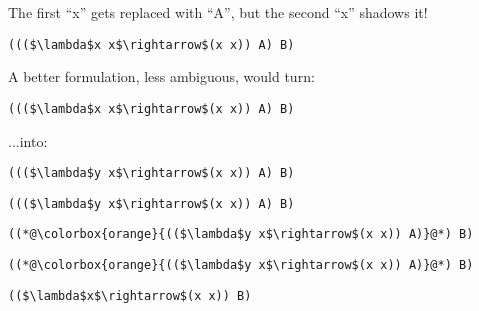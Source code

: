 \documentclass{beamer}
\begin{document}
\begin{frame}[fragile]{\CurrentSection}
\begin{exampleblock}{}
The first ``x'' gets replaced with ``A'', but the second ``x'' shadows it!
\end{exampleblock}

 
\lstset{basicstyle=\ttfamily\small}\lstset{numbers=none}\lstset{language=ML}\begin{lstlisting}
((($\lambda$x x$\rightarrow$(x x)) A) B)
\end{lstlisting}
 

\end{frame}

\begin{frame}[fragile]{\CurrentSection}
\begin{exampleblock}{}
A better formulation, less ambiguous, would turn:
\end{exampleblock}

 
\lstset{basicstyle=\ttfamily\small}\lstset{numbers=none}\lstset{language=ML}\begin{lstlisting}
((($\lambda$x x$\rightarrow$(x x)) A) B)
\end{lstlisting}
 
\begin{exampleblock}{}
...into:
\end{exampleblock}

 
\lstset{basicstyle=\ttfamily\small}\lstset{numbers=none}\lstset{language=ML}\begin{lstlisting}
((($\lambda$y x$\rightarrow$(x x)) A) B)
\end{lstlisting}
 

\end{frame}

\begin{frame}[fragile]{\CurrentSection}
\lstset{basicstyle=\ttfamily\small}\lstset{numbers=none}\lstset{language=ML}\begin{lstlisting}
((($\lambda$y x$\rightarrow$(x x)) A) B)
\end{lstlisting}
\pause\lstset{language=ML}\begin{lstlisting}
((*@\colorbox{orange}{(($\lambda$y x$\rightarrow$(x x)) A)}@*) B)
\end{lstlisting}

\end{frame}

\begin{frame}[fragile]{\CurrentSection}
\lstset{basicstyle=\ttfamily\small}\lstset{numbers=none}\lstset{language=ML}\begin{lstlisting}
((*@\colorbox{orange}{(($\lambda$y x$\rightarrow$(x x)) A)}@*) B)
\end{lstlisting}
\pause\lstset{language=ML}\begin{lstlisting}
(($\lambda$x$\rightarrow$(x x)) B)
\end{lstlisting}

\end{frame}
\end{document}
